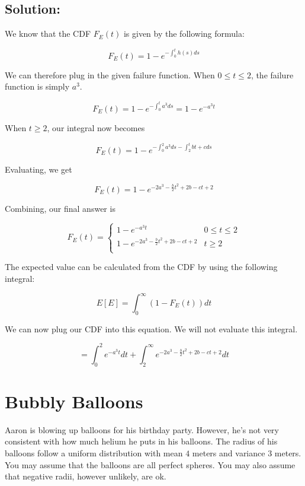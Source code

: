 \documentclass{article}
\begin{document}
\subsection{Solution:}

We know that the CDF $F_E(t)$ is given by the following formula:

$$F_E(t) = 1 - e^{- \int_0^t h(s)ds}$$

We can therefore plug in the given failure function. When $0 \leq t \leq 2$, the failure function is simply $a^3$.

$$F_E(t) = 1 - e^{- \int_0^t a^3ds} = 1 - e^{-a^3 t}$$

When $t \geq 2$, our integral now becomes

$$F_E(t) = 1 - e^{- \int_0^2 a^3ds - \int_2^t bt + c ds}$$

Evaluating, we get

$$F_E(t) = 1 - e^{- 2a^3 - \frac{b}{2}t^2 + 2b - ct + 2}$$

Combining, our final answer is

\[ \boxed{
F_E(t) = 
\begin{cases}
1 - e^{-a^3 t} & 0 \leq t \leq 2 \\
1 - e^{- 2a^3 - \frac{b}{2}t^2 + 2b - ct + 2} & t \geq 2 \\
\end{cases} }
\]

\vspace{2cm}

The expected value can be calculated from the CDF by using the following integral:

$$E[E] = \int_0^{\infty}(1 - F_E(t))dt$$

We can now plug our CDF into this equation. We will not evaluate this integral.

$$\boxed{= \int_0^{2}e^{-a^3 t}dt + \int_2^{\infty}e^{- 2a^3 - \frac{b}{2}t^2 + 2b - ct + 2}dt}$$

\newpage

\section{Bubbly Balloons}

Aaron is blowing up balloons for his birthday party. However, he's not very consistent with how much helium he puts in his balloons. The radius of his balloons follow a uniform distribution with mean $4$ meters and variance $3$ meters. You may assume that the balloons are all perfect spheres. You may also assume that negative radii, however unlikely, are ok.
\end{document}
